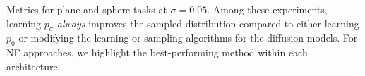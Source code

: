 \begin{table}[H]
\caption{Metrics for plane and sphere tasks at $\sigma = 0.05$. Among these experiments, learning $p_{\sigma}$ \emph{always} improves the sampled distribution compared to either learning $p_{0}$ or modifying the learning or sampling algorithms for the diffusion models. For NF approaches, we highlight the best-performing method within each architecture.}
\label{tab:PlaneSphereMetrics}
\end{table}
